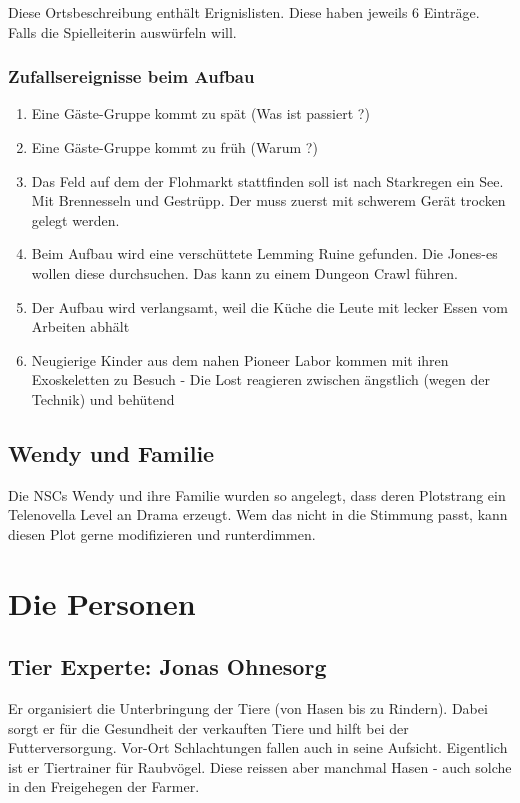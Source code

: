 Diese Ortsbeschreibung enthält Erignislisten. Diese haben jeweils 6 Einträge. Falls die Spielleiterin auswürfeln will.

\subsection{Zufallsereignisse beim Aufbau}

\begin{enumerate}
\item Eine Gäste-Gruppe kommt zu spät (Was ist passiert ?)
\item Eine Gäste-Gruppe kommt zu früh (Warum ?)
\item Das Feld auf dem der Flohmarkt stattfinden soll ist nach Starkregen ein See. Mit Brennesseln und Gestrüpp. Der muss zuerst mit schwerem Gerät trocken gelegt werden.
\item Beim Aufbau wird eine verschüttete Lemming Ruine gefunden. Die Jones-es wollen diese durchsuchen. Das kann zu einem Dungeon Crawl führen.
\item Der Aufbau wird verlangsamt, weil die Küche die Leute mit lecker Essen vom Arbeiten abhält
\item Neugierige Kinder aus dem nahen Pioneer Labor kommen mit ihren Exoskeletten zu Besuch - Die Lost reagieren zwischen ängstlich (wegen der Technik) und behütend
\end{enumerate}

\section{Wendy und Familie}

Die NSCs Wendy und ihre Familie wurden so angelegt, dass deren Plotstrang ein Telenovella Level an Drama erzeugt. Wem das nicht in die Stimmung passt, kann diesen Plot gerne modifizieren und runterdimmen.

\chapter{Die Personen}

\section{Tier Experte: Jonas Ohnesorg}

Er organisiert die Unterbringung der Tiere (von Hasen bis zu Rindern). Dabei sorgt er für die Gesundheit der verkauften Tiere und hilft bei der Futterversorgung. Vor-Ort Schlachtungen fallen auch in seine Aufsicht. Eigentlich ist  er Tiertrainer für Raubvögel. Diese reissen aber manchmal Hasen - auch solche in den Freigehegen der Farmer.

